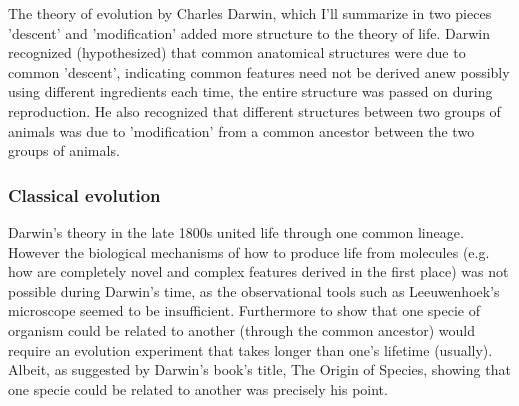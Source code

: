 The theory of evolution by Charles Darwin, which I'll summarize in two pieces 'descent' and 'modification' added  more structure to the theory of life.  Darwin recognized (hypothesized) that common anatomical structures were due to common 'descent', indicating common features need not be derived anew possibly using different ingredients each time, the entire structure was passed on during reproduction.  He also recognized that different structures between two groups of animals was due to 'modification' from a common ancestor between the two groups of animals.

\subsubsection{Classical evolution}

Darwin's theory in the late 1800s united life through one common lineage.  However the biological mechanisms of how to produce life from molecules (e.g. how are completely novel and complex features derived in the first place) was not possible during Darwin's time, as the observational tools such as Leeuwenhoek's microscope seemed to be insufficient.  Furthermore to show that one specie of organism could be related to another (through the common ancestor) would require an evolution experiment that takes longer than one's lifetime (usually).  Albeit, as suggested by Darwin's book's title, The Origin of Species, showing that one specie could be related to another was precisely his point.

